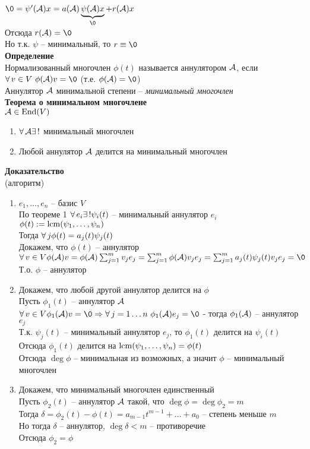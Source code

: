 \documentclass[12pt]{article}
\begin{document}
$\0 = \psi'(\mcA)x = a(\mcA)\ub\0{\psi(\mcA)x} + r(\mcA)x$\\
Отсюда $r(\mcA) = \0$\\
Но т.к. $\psi$ -- минимальный, то $r \equiv \0$\\
\textbf{Определение}\\
Нормализованный многочлен $\phi(t)$ называется аннулятором $\mathcal{A}$, если $\fall v \in V\ \phi(\mcA)v = \0$ (т.е. $\phi(\mcA) = \0$)\\
Аннулятор $\mathcal{A}$ минимальной степени -- \textit{минимальный многочлен}\\
\textbf{Теорема о минимальном многочлене}\\
$\mathcal{A} \in \operatorname{End}(V)$
\begin{enumerate}
    \item $\forall\, \mathcal{A} \exists\,!$ минимальный многочлен
    \item Любой аннулятор $\mathcal{A}$ делится на минимальный многочлен
\end{enumerate}
\textbf{Доказательство}\\
(алгоритм)
\begin{enumerate}
    \item $e_1, \ldots, e_n$ -- базис $V$\\
    По теореме 1 $\forall\, e_i \exists\,! \psi_i(t)$ -- минимальный аннулятор $e_i$\\
    $\phi(t) := \operatorname{lcm} (\psi_1, \ldots, \psi_n)$\\
    Тогда $\forall\, j \phi(t) = a_j(t)\psi_j(t)$\\
    Докажем, что $\phi(t)$ -- аннулятор\\
    $\fall v \in V \phi(\mcA)v = \phi(\mcA) \sum_{j=1}^m v_j e_j = \sum_{j=1}^m \phi(\mcA) v_j e_j = \sum_{j=1}^m a_j(t)\psi_j(t) v_j e_j = \0$\\
    Т.о. $\phi$ -- аннулятор
    \item Докажем, что любой другой аннулятор делится на $\phi$\\
    Пусть $\phi_1(t)$ -- аннулятор $\mathcal{A}$\\
    $\fall v \in V \phi_1(\mcA)v = \0 \Rto \fall j=1\ldots n\ \phi_1(\mcA)e_j=\0$ - тогда $\phi_1(\mathcal{A})$ -- аннулятор $e_j$\\
    Т.к. $\psi_j(t)$ -- минимальный аннулятор $e_j$, то $\phi_1(t)$ делится на $\psi_i(t)$\\
    Отсюда $\phi_1(t)$ делится на $\operatorname{lcm}(\psi_1, \ldots, \psi_n) = \phi(t)$\\
    Отсюда $\deg \phi$ -- минимальная из возможных, а значит $\phi$ -- минимальный многочлен
    \item Докажем, что минимальный многочлен единственный\\
    Пусть $\phi_2(t)$ -- аннулятор $\mathcal{A}$ такой, что $\deg \phi = \deg \phi_2 = m$\\
    Тогда $\delta = \phi_2(t) - \phi(t) = a_{m-1}t^{m-1} + \ldots + a_0$ -- степень меньше $m$\\
    Но тогда $\delta$ -- аннулятор, $\deg \delta < m$ -- противоречие\\
    Отсюда $\phi_2 = \phi$\\
\end{enumerate}
\end{document}
